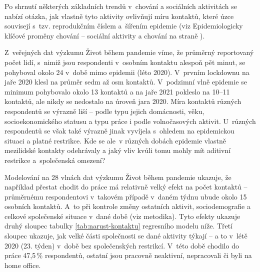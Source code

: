 Po shrnutí některých základních trendů v chování a sociálních aktivitách se nabízí otázka, jak vlastně tyto aktivity ovlivňují míru kontaktů, které úzce souvisejí s tzv. reprodukčním číslem a šířením epidemie (viz Epidemiologicky klíčové proměny cho\-vá\-ní – sociální aktivity a chování na straně \pageref{Epidemi_promeny}). 

Z veřejných dat výzkumu Život během pandemie víme, že průměrný reportovaný počet lidí, s nimiž jsou respondenti v osobním kontaktu alespoň pět minut, se pohyboval okolo 24 v době mimo epidemii (léto 2020). V prvním lockdownu na jaře 2020 klesl na průměr sedm až osm kontaktů. V podzimní vlně epidemie se minimum pohybovalo okolo 13 kontaktů a na jaře 2021 pokleslo na 10--11 kontaktů, ale nikdy se nedostalo na úroveň jara 2020. Míra kontaktů různých respondentů se výrazně liší – podle typu jejich domácnosti, věku, socioekonomického statusu a typu práce i podle volnočasových aktivit. U~různých respondentů se však také výrazně jinak vyvíjela s ohledem na epidemickou situaci a platné restrikce. Kde se ale v různých dobách epidemie vlastně mezilidské kontakty odehrávaly a jaký vliv kvůli tomu mohly mít aditivní restrikce a společenská omezení? 

Modelování na 28 vlnách dat výzkumu Život během pandemie ukazuje, že na\-pří\-klad přestat chodit do práce má relativně velký efekt na počet kontaktů – průměrnému respondentovi v takovém případě v daném týdnu ubude okolo 15 osobních kontaktů. A~to při kontrole změny ostatních aktivit, sociodemografie a celkové společenské situace v dané době (viz metodika). Tyto efekty ukazuje druhý sloupec tabulky \ref{tab:narust-kontaktu} regresního modelu níže. Třetí sloupec ukazuje, jak velké části společnosti se dané aktivity týkají – a to v létě 2020 (23. týden)
v době bez společenských restrikcí. V~této době chodilo do práce 47,5\,\% respondentů, ostatní jsou pracovně neaktivní, nepracovali či byli na home office. 


